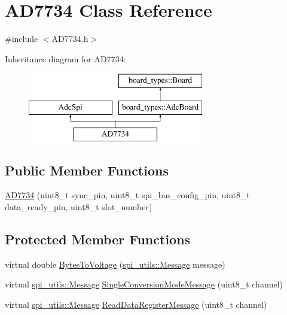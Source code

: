 \hypertarget{classAD7734}{}\section{A\+D7734 Class Reference}
\label{classAD7734}


{\ttfamily \#include $<$A\+D7734.\+h$>$}

Inheritance diagram for A\+D7734\+:\begin{figure}[H]
\begin{center}
\leavevmode
\includegraphics[height=3.000000cm]{classAD7734}
\end{center}
\end{figure}
\subsection*{Public Member Functions}
\begin{DoxyCompactItemize}
\item 
\mbox{\hyperlink{classAD7734_a2bf3cea4357919fda364b8121cd6af4f}{A\+D7734}} (uint8\+\_\+t sync\+\_\+pin, uint8\+\_\+t spi\+\_\+bus\+\_\+config\+\_\+pin, uint8\+\_\+t data\+\_\+ready\+\_\+pin, uint8\+\_\+t slot\+\_\+number)
\end{DoxyCompactItemize}
\subsection*{Protected Member Functions}
\begin{DoxyCompactItemize}
\item 
virtual double \mbox{\hyperlink{classAD7734_aa13b49141e69a45508998004a208afdc}{Bytes\+To\+Voltage}} (\mbox{\hyperlink{structspi__utils_1_1Message}{spi\+\_\+utils\+::\+Message}} message)
\item 
virtual \mbox{\hyperlink{structspi__utils_1_1Message}{spi\+\_\+utils\+::\+Message}} \mbox{\hyperlink{classAD7734_af677fbfbae0ec1c78b453ceb4a6736ec}{Single\+Conversion\+Mode\+Message}} (uint8\+\_\+t channel)
\item 
virtual \mbox{\hyperlink{structspi__utils_1_1Message}{spi\+\_\+utils\+::\+Message}} \mbox{\hyperlink{classAD7734_a6fa5e7c2bd8cde50dccb328d36f12516}{Read\+Data\+Register\+Message}} (uint8\+\_\+t channel)
\end{DoxyCompactItemize}


